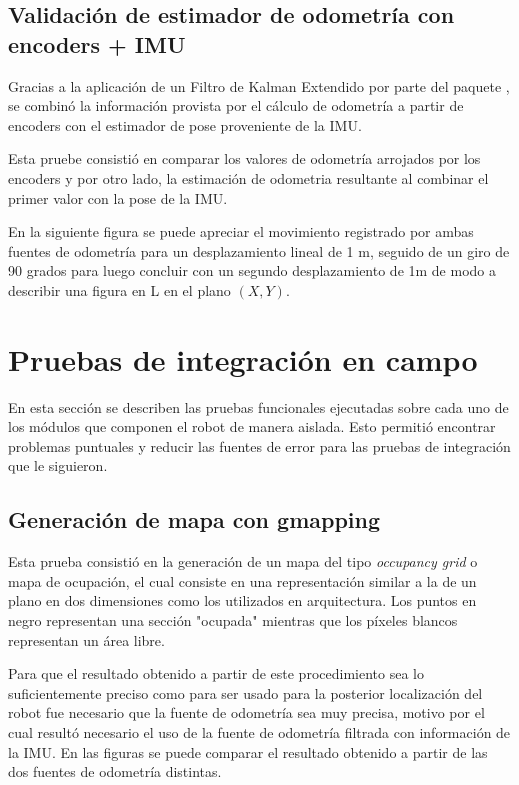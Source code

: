 \subsection{Validación de estimador de odometría con encoders + IMU}

Gracias a la aplicación de un Filtro de Kalman Extendido por parte del paquete , se combinó la información provista por el cálculo de odometría a partir de encoders con el estimador de pose proveniente de la IMU.

Esta pruebe consistió en comparar los valores de odometría arrojados por los encoders y por otro lado, la estimación de odometria resultante al combinar el primer valor con la pose de la IMU.

En la siguiente figura se puede apreciar el movimiento registrado por ambas fuentes de odometría para un desplazamiento lineal de 1 m, seguido de un giro de 90 grados para luego concluir con un segundo desplazamiento de 1m de modo a describir una figura en L en el plano $(X,Y)$.

\section{Pruebas de integración en campo}

En esta sección se describen las pruebas funcionales ejecutadas sobre cada uno de los módulos que componen el robot de manera aislada. Esto permitió encontrar problemas puntuales y reducir las fuentes de error para las pruebas de integración que le siguieron.

\subsection{Generación de mapa con gmapping}

Esta prueba consistió en la generación de un mapa del tipo \textit{occupancy grid} o mapa de ocupación, el cual consiste en una representación similar a la de un plano en dos dimensiones como los utilizados en arquitectura. Los puntos en negro representan una sección "ocupada" mientras que los píxeles blancos representan un área libre.

Para que el resultado obtenido a partir de este procedimiento sea lo suficientemente preciso como para ser usado para la posterior localización del robot fue necesario que la fuente de odometría sea muy precisa, motivo por el cual resultó necesario el uso de la fuente de odometría filtrada con información de la IMU. En las figuras se puede comparar el resultado obtenido a partir de las dos fuentes de odometría distintas.

